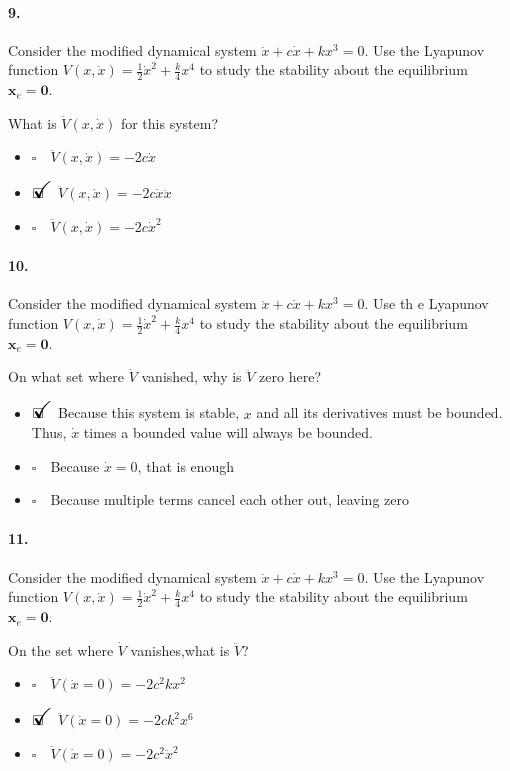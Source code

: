 \documentclass[12pt, a4paper]{article}
\newcommand{\ans}{\item[]$\rlap{\LARGE{\checkmark}}\square\quad$}
\newcommand{\noans}{\item[]$\square\quad$}
\begin{document}
\paragraph{9.}
Consider the modified dynamical system $\ddot{x}+c\dot{x}+kx^{3}=0$. Use the Lyapunov function $V(x,\dot{x})=\frac{1}{2}\dot{x}^{2} + \frac{k}{4}x^{4}$ to study the stability about the equilibrium $\bm{x}_{e}=\bm{0}$. \medskip

What is $\ddot{V}(x,\dot{x})$ for this system?

\begin{itemize}
    \noans $\ddot{V}(x,\dot{x})=-2c\dot{x}$
    \ans $\ddot{V}(x,\dot{x})=-2c\dot{x}\ddot{x}$
    \noans $\ddot{V}(x,\dot{x})=-2c\dot{x}^{2}$
\end{itemize}

\paragraph{10.}
Consider the modified dynamical system $\ddot{x}+c\dot{x}+kx^{3}=0$. Use th
e Lyapunov function $V(x,\dot{x})=\frac{1}{2}\dot{x}^{2} + \frac{k}{4}x^{4}$ to study the stability about the equilibrium $\bm{x}_{e}=\bm{0}$. \medskip

On what set where $\dot{V}$ vanished, why is $\ddot{V}$ zero here?

\begin{itemize}
    \ans Because this system is stable, $x$ and all its derivatives must be bounded. Thus, $\dot{x}$ times a bounded value will always be bounded.
    \noans Because $\dot{x} = 0$, that is enough
    \noans Because multiple terms cancel each other out, leaving zero
\end{itemize}

\paragraph{11.}
Consider the modified dynamical system $\ddot{x}+c\dot{x}+kx^{3}=0$. Use the Lyapunov function $V(x,\dot{x})=\frac{1}{2}\dot{x}^{2} + \frac{k}{4}x^{4}$ to study the stability about the equilibrium $\bm{x}_{e}=\bm{0}$. \medskip

On the set where $\dot{V}$ vanishes,what is $\ddot{V}$?

\begin{itemize}
    \noans $\ddot{V}(\dot{x}=0) = -2c^{2}kx^{2}$
    \ans $\ddot{V}(\dot{x}=0) = -2ck^{2}x^{6}$
    \noans $\ddot{V}(\dot{x}=0) = -2c^{2}\ddot{x}^{2}$
\end{itemize}
\end{document}
